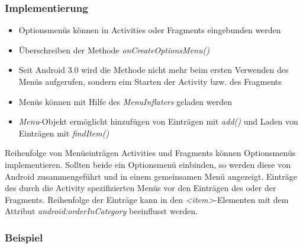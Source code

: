 \begin{frame}
   \frametitle{Implementierung}
   \begin{itemize}
      \item Optionsmenüs können in Activities oder Fragments eingebunden werden
      \item Überschreiben der Methode \emph{onCreateOptionsMenu()}
      \item Seit Android 3.0 wird die Methode nicht mehr beim ersten 
         Verwenden des Menüs aufgerufen, sondern eim Starten der Activity bzw. des Fragments
      \item Menüs können mit Hilfe des \emph{MenuInflaters} geladen werden
      \item \emph{Menu}-Objekt ermöglicht hinzufügen von Einträgen 
         mit \emph{add()} und Laden von Einträgen mit \emph{findItem()}
   \end{itemize}

   \begin{alertblock}{Reihenfolge von Menüeinträgen}
      Activities und Fragments können Optionsmenüs implementieren.
      Sollten beide ein Optionsmenü einbinden, so werden 
      diese von Android zusammengeführt und in einem gemeinsamen Menü angezeigt. 
      Einträge des durch die Activity spezifizierten Menüs vor den Einträgen 
      des oder der Fragments. Reihenfolge der Einträge kann in den 
      \emph{\textless{}item\textgreater}-Elementen mit dem Attribut 
      \emph{android:orderInCategory} beeinflusst werden.
   \end{alertblock}
\end{frame}

\begin{frame}
   \frametitle{Beispiel}
   
\end{frame}

